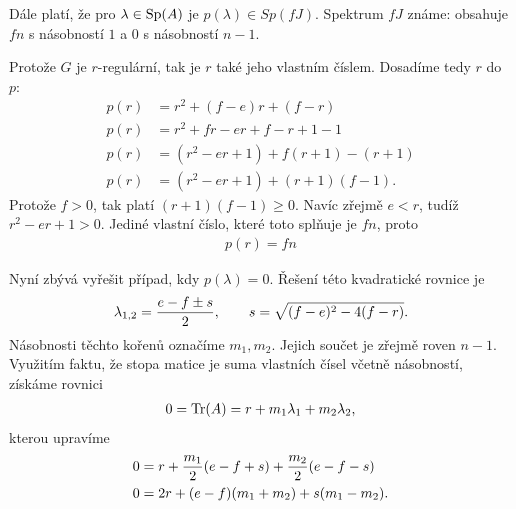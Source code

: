 Dále platí, že pro $\lambda \in \operatorname{Sp}(A)$ je $p(\lambda) \in Sp(fJ)$. Spektrum $fJ$ známe: obsahuje $fn$ s násobností $1$ a $0$ s násobností $n-1$.

Protože $G$ je $r$-regulární, tak je $r$ také jeho vlastním číslem. Dosadíme tedy $r$ do $p$:
\begin{align}
p(r) &= r^2 + (f-e)r + (f-r) \\
p(r) &= r^2 +fr -er +f -r +1 -1 \\
p(r) &= (r^2 -er +1) + f(r+1) -(r+1) \\
p(r) &= (r^2 -er +1) + (r+1)(f-1).
\end{align}
Protože $f>0$, tak platí $(r+1)(f-1) \geq 0$.
Navíc zřejmě $e<r$, tudíž $r^2 -er +1 >0$. Jediné vlastní číslo, které toto splňuje je $fn$, proto
\begin{align}
\label{4-3:vztah-pro-vrcholy}
p(r) = fn
\end{align}

Nyní zbývá vyřešit případ, kdy $p(\lambda)=0$.
Řešení této kvadratické rovnice je 
\begin{align}
\lambda_{1,2} = {e-f \pm s \over 2}, \qquad s = \sqrt{(f-e)^2 -4(f-r)}.
\end{align}
Násobnosti těchto kořenů označíme $m_1, m_2$. Jejich součet je zřejmě roven $n-1$.
Využitím faktu, že stopa matice je suma vlastních čísel 
včetně násobností, získáme rovnici
\begin{align}
	0 = \operatorname{Tr}(A) = r + m_1\lambda_1 + m_2\lambda_2,
\end{align}
kterou upravíme
\begin{align}
0 &= r + {m_1 \over 2}(e -f +s) + {m_2 \over 2}(e -f -s) \\
0 &= 2r + (e-f)(m_1 +m_2) +s(m_1 -m_2). \label{4-3:rovnice-pro-s}
\end{align}

